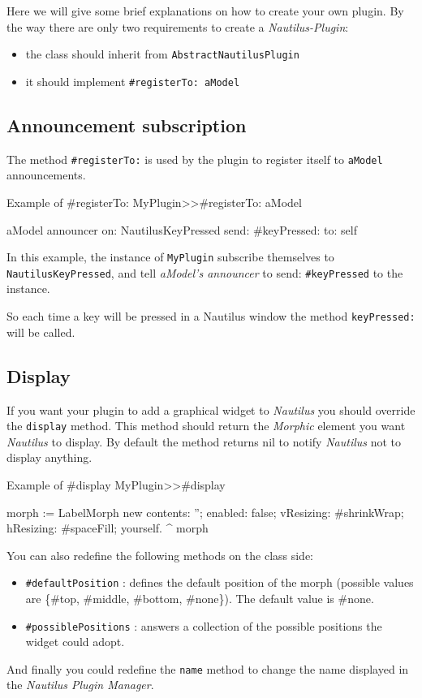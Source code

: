 \documentclass[a4paper,10pt,twoside]{book}
\newcommand\nautilus{\emph{Nautilus}\xspace}
\begin{document}
Here we will give some brief explanations on how to create your own plugin.
By the way there are only two requirements to create a \emph{Nautilus-Plugin}:
\begin{itemize}
	\item the class should inherit from \verb?AbstractNautilusPlugin?
	\item it should implement \verb?#registerTo: aModel?
\end{itemize}


\subsection{Announcement subscription}

The method \verb?#registerTo:? is used by the plugin to register itself to \verb?aModel? announcements.

\begin{code}{Example of #registerTo:}
MyPlugin>>#registerTo: aModel

	aModel announcer
		on: NautilusKeyPressed send: #keyPressed: to: self
\end{code}
In this example, the instance of \verb?MyPlugin? subscribe themselves to \verb?NautilusKeyPressed?, and tell \emph{aModel's announcer} to send: \verb?#keyPressed? to the instance.

So each time a key will be pressed in a Nautilus window the method \verb?keyPressed:? will be called.

\subsection{Display}

If you want your plugin to add a graphical widget to \nautilus you should override the \verb?display? method. This method should return the \emph{Morphic} element you want \nautilus to display. By default the method returns nil to notify \nautilus not to display anything.

\begin{code}{Example of #display}
MyPlugin>>#display

	morph :=  LabelMorph new 
					contents: '';
					enabled: false;
					vResizing: #shrinkWrap;
					hResizing: #spaceFill;
					yourself.
	^ morph
\end{code}

You can also redefine the following methods on the class side:
\begin{itemize}
	\item \verb?#defaultPosition? : defines the default position of the morph (possible values are \{\#top, \#middle, \#bottom, \#none\}). The default value is \#none.
	\item \verb?#possiblePositions? : answers a collection of the possible positions the widget could adopt.
\end{itemize}

And finally you could redefine the \verb?name? method to change the name displayed in the \emph{Nautilus Plugin Manager}.
\end{document}
